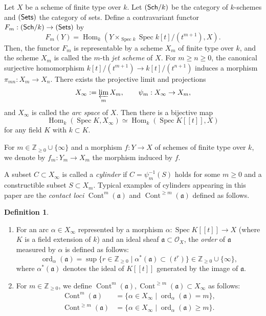 \documentclass[a4paper,11pt]{amsart}
\theoremstyle{definition}
\newtheorem{defi}[thm]{Definition}
\theoremstyle{remark}
\begin{document}
Let $X$ be a scheme of finite type over $k$. 
Let $({\sf Sch}/k)$ be the category of $k$-schemes and $({\sf Sets})$ the category of sets.
Define a contravariant functor  $F_{m}: ({\sf Sch}/k) \to ({\sf Sets})$ by 
\[
 F_{m}(Y) = \operatorname{Hom} _{k}\left( Y\times_{\operatorname{Spec} k} \operatorname{Spec} k[t]/(t^{m+1}), X \right).
\]
Then, the functor $F_{m}$ is representable by a scheme $X_m$ of finite type over $k$, and 
the scheme $X_m$ is called the $m$-th \textit{jet scheme} of $X$.
For $m \ge n \ge 0$, the canonical surjective homomorphism $k[t]/(t^{m+1}) \to k[t]/(t^{n+1})$ induces a morphism $\pi_{mn}:X_m \to X_n$.
There exists the projective limit and projections
\[
X_\infty := \mathop{\varprojlim}\limits_{m} X_m, \qquad \psi_{m}:X_{\infty} \to X_m, 
\]
and $X_{\infty}$ is called the {\it arc space} of $X$. 
Then there is a bijective map
\[
\operatorname{Hom} _{k}(\operatorname{Spec} K, X_{\infty}) \simeq \operatorname{Hom} _{k}(\operatorname{Spec} K[[t]], X)
\]
for any field $K$ with $k\subset K$. 

For $m\in\mathbb Z_{\ge 0}\cup\{\infty\}$ and a morphism $f:Y\to X$ of  schemes  of  finite type over $k$,
we denote by $f_m : Y_m \to X_m$ the morphism induced by $f$.

A subset $C \subset X_{\infty}$ is called a \textit{cylinder} if $C = \psi_{m} ^{-1}(S)$ holds for some $m \ge 0$ and 
a constructible subset $S \subset X_m$. Typical examples of cylinders appearing in this paper are the \textit{contact loci} 
$\operatorname{Cont}^{m}(\mathfrak{a})$ and $\operatorname{Cont}^{\geq m}(\mathfrak{a})$ defined as follows. 

\begin{defi}\label{defi:ord_cont}
\begin{enumerate}
\item
For an arc $\alpha \in X_{\infty}$ represented by a morphism $\alpha: \operatorname{Spec} K[[t]] \to X$ (where $K$ is a field extension of $k$) and an ideal sheaf $\mathfrak{a} \subset \mathcal{O}_X$, 
the \textit{order} of $\mathfrak{a}$ measured by $\alpha$ is defined as follows:
\[
\operatorname{ord}_{\alpha} (\mathfrak{a}) = \sup \{ r \in \mathbb{Z}_{\geq 0} \mid \alpha^*(\mathfrak{a}) \subset (t^r) \} \in \mathbb{Z}_{\ge 0} \cup \{ \infty \}, 
\]
where $\alpha^*(\mathfrak{a})$ denotes the ideal of $K[[t]]$ generated by the image of $\mathfrak{a}$.


\item For $m \in \mathbb{Z}_{\ge 0}$, we define $\operatorname{Cont}^{m}(\mathfrak{a}), \operatorname{Cont}^{\geq m}(\mathfrak{a}) \subset X_{\infty}$ as follows:
\begin{align*}
\operatorname{Cont}^{m}(\mathfrak{a}) &= \{ \alpha \in X_\infty \mid \operatorname{ord}_{\alpha}(\mathfrak a)= m\}, \\
\operatorname{Cont}^{\geq m}(\mathfrak{a}) &= \{ \alpha \in X_\infty \mid \operatorname{ord}_{\alpha}(\mathfrak a)\geq m\}.
\end{align*}
\end{enumerate}
\end{defi}
\end{document}
